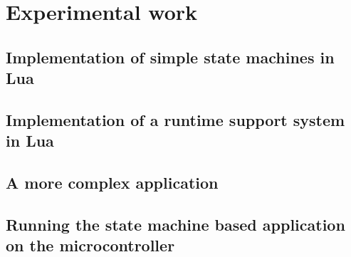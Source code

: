 \chapter{Experimental work}
\label{ch:experimental_work}

\section{Implementation of simple state machines in Lua}
\label{sec:impl_state_machines}

\section{Implementation of a runtime support system in Lua}
\label{sec:impl_runtime_support}

\section{A more complex application}
\label{sec:impl_complex_app}

\section{Running the state machine based application on the microcontroller}
\label{sec:running_on_micro}